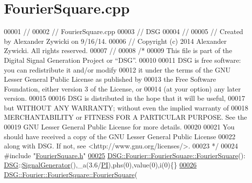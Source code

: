 \hypertarget{_fourier_square_8cpp_source}{\section{Fourier\+Square.\+cpp}
\label{_fourier_square_8cpp_source}
}

\begin{DoxyCode}
00001 \textcolor{comment}{//}
00002 \textcolor{comment}{//  FourierSquare.cpp}
00003 \textcolor{comment}{//  DSG}
00004 \textcolor{comment}{//}
00005 \textcolor{comment}{//  Created by Alexander Zywicki on 9/16/14.}
00006 \textcolor{comment}{//  Copyright (c) 2014 Alexander Zywicki. All rights reserved.}
00007 \textcolor{comment}{//}
00008 \textcolor{comment}{/*}
00009 \textcolor{comment}{ This file is part of the Digital Signal Generation Project or “DSG”.}
00010 \textcolor{comment}{}
00011 \textcolor{comment}{ DSG is free software: you can redistribute it and/or modify}
00012 \textcolor{comment}{ it under the terms of the GNU Lesser General Public License as published by}
00013 \textcolor{comment}{ the Free Software Foundation, either version 3 of the License, or}
00014 \textcolor{comment}{ (at your option) any later version.}
00015 \textcolor{comment}{}
00016 \textcolor{comment}{ DSG is distributed in the hope that it will be useful,}
00017 \textcolor{comment}{ but WITHOUT ANY WARRANTY; without even the implied warranty of}
00018 \textcolor{comment}{ MERCHANTABILITY or FITNESS FOR A PARTICULAR PURPOSE.  See the}
00019 \textcolor{comment}{ GNU Lesser General Public License for more details.}
00020 \textcolor{comment}{}
00021 \textcolor{comment}{ You should have received a copy of the GNU Lesser General Public License}
00022 \textcolor{comment}{ along with DSG.  If not, see <http://www.gnu.org/licenses/>.}
00023 \textcolor{comment}{ */}
00024 \textcolor{preprocessor}{#include "\hyperlink{_fourier_square_8h}{FourierSquare.h}"}
\hypertarget{_fourier_square_8cpp_source_l00025}{}\hyperlink{class_d_s_g_1_1_fourier_1_1_fourier_square_a48fa53b8b5ea77013e1bbb2b2467d15e}{00025} \hyperlink{class_d_s_g_1_1_fourier_1_1_fourier_square_a48fa53b8b5ea77013e1bbb2b2467d15e}{DSG::Fourier::FourierSquare::FourierSquare}():
      \hyperlink{namespace_d_s_g}{DSG}::\hyperlink{class_d_s_g_1_1_signal_generator}{SignalGenerator}(),\_a(3.6/\hyperlink{_p_i_8h_a598a3330b3c21701223ee0ca14316eca}{PI}),phs(0),value(0),i(0)\{\}
\hypertarget{_fourier_square_8cpp_source_l00026}{}\hyperlink{class_d_s_g_1_1_fourier_1_1_fourier_square_a277316295ca15354a6e507a71cb5f0db}{00026} \hyperlink{class_d_s_g_1_1_fourier_1_1_fourier_square_a48fa53b8b5ea77013e1bbb2b2467d15e}{DSG::Fourier::FourierSquare::FourierSquare}(

\end{DoxyCode}
